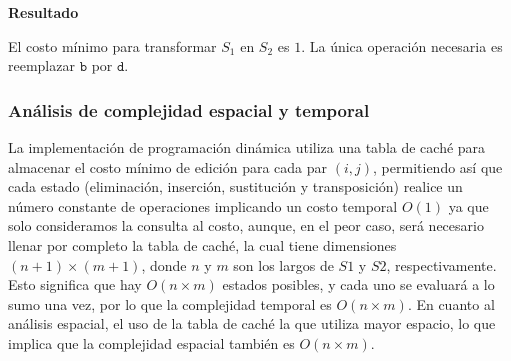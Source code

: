 \textbf{Resultado}

El costo mínimo para transformar \( S_1 \) en \( S_2 \) es \( 1 \). La única operación necesaria es reemplazar \( \texttt{b} \) por \( \texttt{d} \).


\subsubsection{Análisis de complejidad espacial y temporal}

    La implementación de programación dinámica utiliza una tabla de caché para almacenar el costo mínimo de edición para cada par $(i,j)$, permitiendo así que cada estado (eliminación, 
    inserción, sustitución y transposición) realice un número constante de operaciones implicando un costo temporal $O(1)$ ya que solo consideramos la consulta al costo, aunque, en el peor caso, será necesario llenar por completo la tabla de caché, la cual tiene 
    dimensiones $(n+1) \times (m+1)$, donde $n$ y $m$ son los largos de $S1$ y $S2$, respectivamente. Esto significa que hay \(O(n \times m)\) estados posibles, y cada uno se evaluará a lo sumo una vez, 
    por lo que la complejidad temporal es \(O(n \times m)\). En cuanto al análisis espacial, el uso de la tabla de caché la que utiliza mayor espacio, lo que 
    implica que la complejidad espacial también es \(O(n \times m)\).
